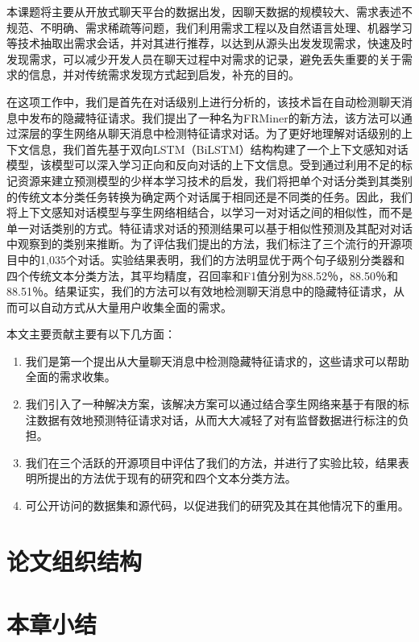 本课题将主要从开放式聊天平台的数据出发，因聊天数据的规模较大、需求表述不规范、不明确、需求稀疏等问题，我们利用需求工程以及自然语言处理、机器学习等技术抽取出需求会话，并对其进行推荐，以达到从源头出发发现需求，快速及时发现需求，可以减少开发人员在聊天过程中对需求的记录，避免丢失重要的关于需求的信息，并对传统需求发现方式起到启发，补充的目的。

在这项工作中，我们是首先在对话级别上进行分析的，该技术旨在自动检测聊天消息中发布的隐藏特征请求。我们提出了一种名为FRMiner的新方法，该方法可以通过深层的孪生网络从聊天消息中检测特征请求对话。为了更好地理解对话级别的上下文信息，我们首先基于双向LSTM（BiLSTM）结构构建了一个上下文感知对话模型，该模型可以深入学习正向和反向对话的上下文信息。受到通过利用不足的标记资源来建立预测模型的少样本学习技术的启发，我们将把单个对话分类到其类别的传统文本分类任务转换为确定两个对话属于相同还是不同类的任务。因此，我们将上下文感知对话模型与孪生网络相结合，以学习一对对话之间的相似性，而不是单一对话类别的方式。特征请求对话的预测结果可以基于相似性预测及其配对对话中观察到的类别来推断。为了评估我们提出的方法，我们标注了三个流行的开源项目中的1,035个对话。实验结果表明，我们的方法明显优于两个句子级别分类器和四个传统文本分类方法，其平均精度，召回率和F1值分别为88.52％，88.50％和88.51％。结果证实，我们的方法可以有效地检测聊天消息中的隐藏特征请求，从而可以自动方式从大量用户收集全面的需求。

本文主要贡献主要有以下几方面：
\begin{enumerate}
    \item  我们是第一个提出从大量聊天消息中检测隐藏特征请求的，这些请求可以帮助全面的需求收集。
    \item 我们引入了一种解决方案，该解决方案可以通过结合孪生网络来基于有限的标注数据有效地预测特征请求对话，从而大大减轻了对有监督数据进行标注的负担。
    \item 我们在三个活跃的开源项目中评估了我们的方法，并进行了实验比较，结果表明所提出的方法优于现有的研究和四个文本分类方法。
    \item 可公开访问的数据集和源代码，以促进我们的研究及其在其他情况下的重用。
\end{enumerate}



\section{论文组织结构}



\section{本章小结}

